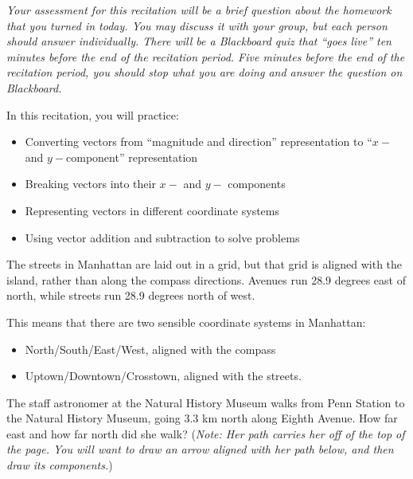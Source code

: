 \documentclass[12pt]{article}
\newcommand{\BI}{\begin{itemize}}
\newcommand{\EI}{\end{itemize}}
\def\BS{\bigskip}
\begin{document}
\Large
\centerline{}
\normalsize
\centerline{}

\it Your assessment for this recitation will be a brief question about the homework that you turned in today. You may discuss it with your group, but each person should answer individually. There will be a Blackboard quiz that ``goes live'' ten minutes before the end of the recitation period. Five minutes before the end of the recitation period, you should stop what you are doing and answer the question on Blackboard.

\rmfamily

\medskip

\rm In this recitation, you will practice:

\BI
\item Converting vectors from ``magnitude and direction'' representation to ``$x-$ and $y-$component'' representation
\item Breaking vectors into their $x-$ and $y-$ components
\item Representing vectors in different coordinate systems
\item Using vector addition and subtraction to solve problems
\EI
\newpage
\begin{minipage}{0.45\textwidth}
The streets in Manhattan are laid out in a grid, but that grid is aligned with the island, rather than along the compass directions. Avenues run 28.9 degrees east of north, while streets run 28.9 degrees north of west. 

This means that there are two sensible coordinate systems in Manhattan:

\BI
\item North/South/East/West, aligned with the compass
\item Uptown/Downtown/Crosstown, aligned with the streets.
\EI


\BS\BS

The staff astronomer at the Natural History Museum walks from Penn Station to the Natural History Museum, going 3.3 km north along Eighth Avenue. How far east and how far north did she walk? ({\it Note: Her path carries her off of the top of the page. You will want to draw an arrow aligned with her path below, and then draw its components.})

\vspace{3in}

\end{minipage}
\hspace{0.05\textwidth}
\end{document}
